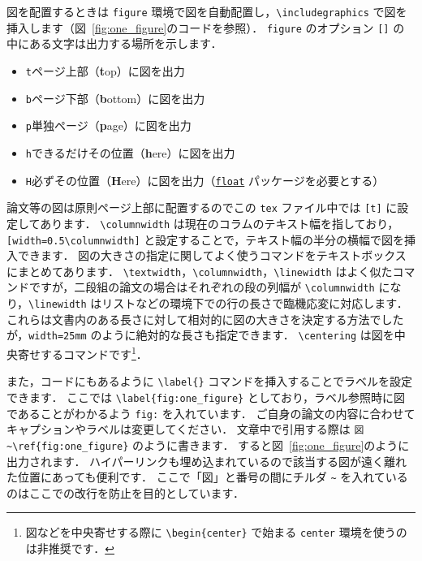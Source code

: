 \documentclass[
    paper=a4paper,      %
    article,            %
    fontsize=11pt,      %
    jafontsize=11pt,    %
    head_space=25mm,    %
    foot_space=25mm,    %
    gutter=20mm,        %
    fore-edge=20mm      %
    ]{jlreq}            %
\begin{document}
図を配置するときは \verb|figure| 環境で図を自動配置し，\verb|\includegraphics| で図を挿入します（図~\ref{fig:one_figure}のコードを参照）．
\verb|figure| のオプション \verb|[]| の中にある文字は出力する場所を示します．
\begin{itemize}
    \item \verb|t|\quad ページ上部（\textbf{t}op）に図を出力
    \item \verb|b|\quad ページ下部（\textbf{b}ottom）に図を出力
    \item \verb|p|\quad 単独ページ（\textbf{p}age）に図を出力
    \item \verb|h|\quad できるだけその位置（\textbf{h}ere）に図を出力
    \item \verb|H|\quad 必ずその位置（\textbf{H}ere）に図を出力（\href{https://ctan.org/pkg/float}{\texttt{float}} パッケージを必要とする）
\end{itemize}
論文等の図は原則ページ上部に配置するのでこの \verb|tex| ファイル中では \verb|[t]| に設定してあります．
\verb|\columnwidth| は現在のコラムのテキスト幅を指しており，\verb|[width=0.5\columnwidth]| と設定することで，テキスト幅の半分の横幅で図を挿入できます．
図の大きさの指定に関してよく使うコマンドをテキストボックスにまとめてあります．
\verb|\textwidth|，\verb|\columnwidth|，\verb|\linewidth| はよく似たコマンドですが，二段組の論文の場合はそれぞれの段の列幅が \verb|\columnwidth| になり，\verb|\linewidth| はリストなどの環境下での行の長さで臨機応変に対応します．
これらは文書内のある長さに対して相対的に図の大きさを決定する方法でしたが，\verb|width=25mm| のように絶対的な長さも指定できます．
\verb|\centering| は図を中央寄せするコマンドです\footnote{図などを中央寄せする際に \texttt{\textbackslash begin\{center\}} で始まる \texttt{center} 環境を使うのは非推奨です．}．

また，コードにもあるように \verb|\label{}| コマンドを挿入することでラベルを設定できます．
ここでは \verb|\label{fig:one_figure}| としており，ラベル参照時に図であることがわかるよう \verb|fig:| を入れています．
ご自身の論文の内容に合わせてキャプションやラベルは変更してください．
文章中で引用する際は \verb|図~\ref{fig:one_figure}| のように書きます．
すると図~\ref{fig:one_figure}のように出力されます．
ハイパーリンクも埋め込まれているので該当する図が遠く離れた位置にあっても便利です．
ここで「図」と番号の間にチルダ \verb|~| を入れているのはここでの改行を防止を目的としています．
\end{document}
